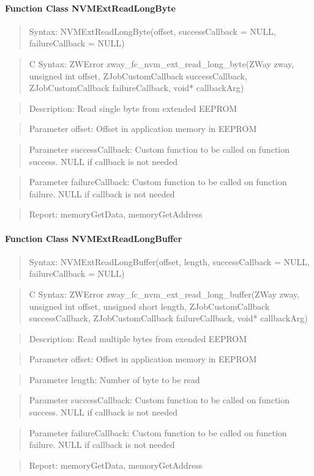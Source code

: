 \paragraph{Function Class NVMExtReadLongByte}
\begin{quote}Syntax: NVMExtReadLongByte(offset, successCallback = NULL, failureCallback = NULL)\end{quote}
\begin{quote}C Syntax: ZWError zway\_fc\_nvm\_ext\_read\_long\_byte(ZWay zway, unsigned int offset, ZJobCustomCallback successCallback, ZJobCustomCallback failureCallback, void* callbackArg)\end{quote}
\begin{quote}Description: Read single byte from extended EEPROM\end{quote}
\begin{quote}Parameter offset: Offset in application memory in EEPROM\end{quote}
\begin{quote}Parameter successCallback: Custom function to be called on function success. NULL if callback is not needed\end{quote}
\begin{quote}Parameter failureCallback: Custom function to be called on function failure. NULL if callback is not needed\end{quote}
\begin{quote}Report: memoryGetData, memoryGetAddress\end{quote}

\paragraph{Function Class NVMExtReadLongBuffer}
\begin{quote}Syntax: NVMExtReadLongBuffer(offset, length, successCallback = NULL, failureCallback = NULL)\end{quote}
\begin{quote}C Syntax: ZWError zway\_fc\_nvm\_ext\_read\_long\_buffer(ZWay zway, unsigned int offset, unsigned short length, ZJobCustomCallback successCallback, ZJobCustomCallback failureCallback, void* callbackArg)\end{quote}
\begin{quote}Description: Read multiple bytes from exended EEPROM\end{quote}
\begin{quote}Parameter offset: Offset in application memory in EEPROM\end{quote}
\begin{quote}Parameter length: Number of byte to be read\end{quote}
\begin{quote}Parameter successCallback: Custom function to be called on function success. NULL if callback is not needed\end{quote}
\begin{quote}Parameter failureCallback: Custom function to be called on function failure. NULL if callback is not needed\end{quote}
\begin{quote}Report: memoryGetData, memoryGetAddress\end{quote}

